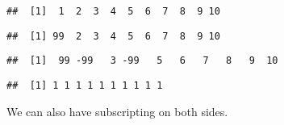 \documentclass[paper=a4,10pt,div=17,headsepline,BCOR=12mm,twoside,open=right]{scrbook}\usepackage{knitr}
\begin{document}
\begin{knitrout}\footnotesize
{}\color{fgcolor}\begin{kframe}
\begin{alltt}
 \hlkwb{<-} \hlopt{:}
\end{alltt}
\begin{verbatim}
##  [1]  1  2  3  4  5  6  7  8  9 10
\end{verbatim}
\begin{alltt}
\hlstd{a[}\hlstd{]} \hlkwb{<-} 
\end{alltt}
\begin{verbatim}
##  [1] 99  2  3  4  5  6  7  8  9 10
\end{verbatim}
\begin{alltt}
\hlstd{a[}\hlstd{(}\hlstd{,}\hlstd{)]} \hlkwb{<-} \hlopt{-}
\end{alltt}
\begin{verbatim}
##  [1]  99 -99   3 -99   5   6   7   8   9  10
\end{verbatim}
\begin{alltt}
\hlstd{a[}\hlstd{]} \hlkwb{<-} 
\end{alltt}
\begin{verbatim}
##  [1] 1 1 1 1 1 1 1 1 1 1
\end{verbatim}
\begin{alltt}
 \hlkwb{<-} 
\end{alltt}
\end{kframe}
\end{knitrout}

We can also have subscripting on both sides.
\end{document}

